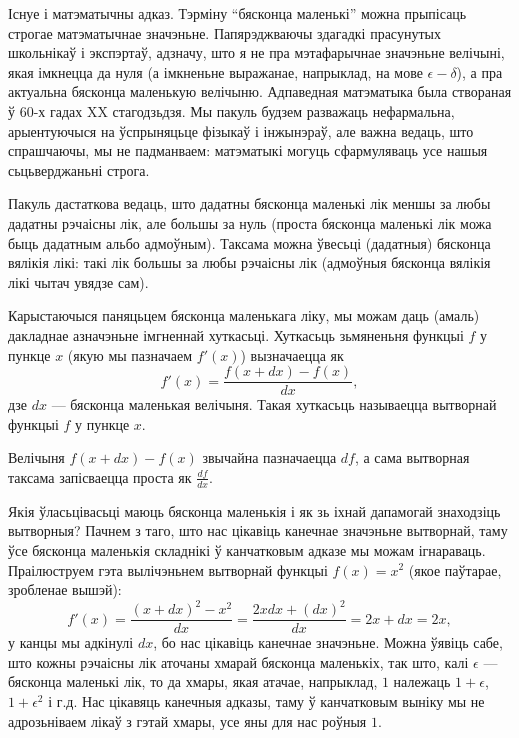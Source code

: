 \documentclass[10pt,a4paper]{book}
\theoremstyle{plain}
\begin{document}
Існуе і матэматычны адказ. Тэрміну ``бясконца маленькі'' можна прыпісаць строгае
матэматычнае значэньне. Папярэджваючы здагадкі прасунутых школьнікаў і
экспэртаў, адзначу, што я не пра мэтафарычнае значэньне велічыні, якая імкнецца
да нуля (а імкненьне выражанае, напрыклад, на мове $\epsilon-\delta$), а пра
актуальна бясконца маленькую велічыню. Адпаведная матэматыка была створаная ў
60-х гадах XX стагодзьдзя. Мы пакуль будзем разважаць нефармальна, арыентуючыся
на ўспрыняцьце фізыкаў і інжынэраў, але важна ведаць, што спрашчаючы, мы не
падманваем: матэматыкі могуць сфармуляваць усе нашыя сьцьверджаньні строга.

Пакуль дастаткова ведаць, што дадатны бясконца маленькі лік меншы за любы
дадатны рэчаісны лік, але большы за нуль (проста бясконца маленькі лік можа быць
дадатным альбо адмоўным). Таксама можна ўвесьці (дадатныя) бясконца вялікія
лікі: такі лік большы за любы рэчаісны лік (адмоўныя бясконца вялікія лікі чытач
увядзе сам).

Карыстаючыся паняцьцем бясконца маленькага ліку, мы можам даць (амаль)
дакладнае азначэньне імгненнай хуткасьці. Хуткасьць зьмяненьня функцыі $f$ у
пункце $x$ (якую мы пазначаем $f'(x)$) вызначаецца як
\begin{equation*}
  f'(x) = \frac{f(x+dx) - f(x)}{dx},
\end{equation*}
дзе $dx$ --- бясконца маленькая велічыня. Такая хуткасьць называецца вытворнай
функцыі $f$ у пункце $x$.

Велічыня $f(x+dx)-f(x)$ звычайна пазначаецца $df$, а сама вытворная таксама
запісваецца проста як $\frac{df}{dx}$.

Якія ўласьцівасьці маюць бясконца маленькія і як зь іхнай дапамогай знаходзіць
вытворныя? Пачнем з таго, што нас цікавіць канечнае значэньне вытворнай, таму
ўсе бясконца маленькія складнікі ў канчатковым адказе мы можам
ігнараваць. Праілюструем гэта вылічэньнем вытворнай функцыі $f(x) = x^2$ (якое
паўтарае, зробленае вышэй):
\begin{equation*}
  f'(x) = \frac{(x+dx)^2 - x^2}{dx} = \frac{2xdx + (dx)^2}{dx} = 2x + dx = 2x,
\end{equation*}
у канцы мы адкінулі $dx$, бо нас цікавіць канечнае значэньне. Можна ўявіць сабе,
што кожны рэчаісны лік аточаны хмарай бясконца маленькіх, так што, калі
$\epsilon$ --- бясконца маленькі лік, то да хмары, якая атачае, напрыклад, $1$
належаць $1 + \epsilon$, $1 + \epsilon^2$ і г.д. Нас цікавяць канечныя адказы,
таму ў канчатковым выніку мы не адрозьніваем лікаў з гэтай хмары, усе яны для
нас роўныя $1$.
\end{document}
